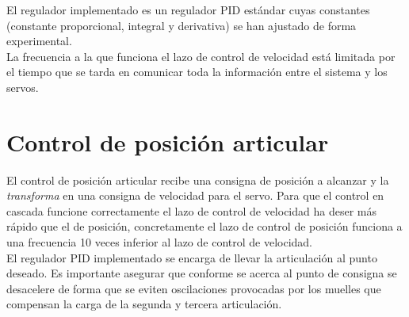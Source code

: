 El regulador implementado es un regulador PID estándar cuyas constantes (constante proporcional, integral y derivativa) se han ajustado de forma experimental.
\\

La frecuencia a la que funciona el lazo de control de velocidad está limitada por el tiempo que se tarda en comunicar toda la información entre el sistema y los servos.

\section{Control de posición articular} \label{sec:Contorl:posicion_articular}

El control de posición articular recibe una consigna de posición a alcanzar y la \textit{transforma} en una consigna de velocidad para el servo. Para que el control en cascada funcione correctamente el lazo de control de velocidad ha deser más rápido que el de posición, concretamente el lazo de control de posición funciona a una frecuencia 10 veces inferior al lazo de control de velocidad.
\\

El regulador PID implementado se encarga de llevar la articulación al punto deseado. Es importante asegurar que conforme se acerca al punto de consigna se desacelere de forma que se eviten oscilaciones provocadas por los muelles que compensan la carga de la segunda y tercera articulación.
